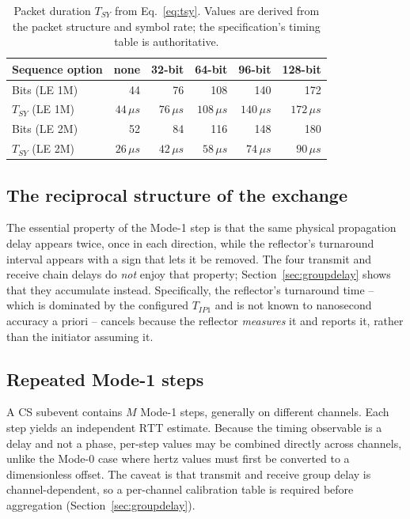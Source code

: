 \documentclass[11pt,a4paper]{article}
\newcommand{\us}{\,\ensuremath{\upmu}s}
\newcommand{\RTT}{\mathrm{RTT}}
\newcommand{\Tsy}{T_{SY}}
\newcommand{\Tip}{T_{IP1}}
\providecommand{\upmu}{\mu}
\begin{document}
\begin{table}[h]
\caption{Packet duration $\Tsy$ from Eq.~\eqref{eq:tsy}. Values are derived from the packet
structure and symbol rate; the specification's timing table is authoritative.}
\label{tab:tsy}
\centering\small
\begin{tabular}{@{}L{30mm}rrrrr@{}}
\toprule
Sequence option & none & 32-bit & 64-bit & 96-bit & 128-bit \\
\midrule
Bits (LE 1M) & 44 & 76 & 108 & 140 & 172 \\
$\Tsy$ (LE 1M) & $44\us$ & $76\us$ & $108\us$ & $140\us$ & $172\us$ \\[2pt]
Bits (LE 2M) & 52 & 84 & 116 & 148 & 180 \\
$\Tsy$ (LE 2M) & $26\us$ & $42\us$ & $58\us$ & $74\us$ & $90\us$ \\
\bottomrule
\end{tabular}
\end{table}

\subsection{The reciprocal structure of the exchange}

The essential property of the Mode-1 step is that the same physical propagation delay appears
twice, once in each direction, while the reflector's turnaround interval appears with a sign that
lets it be removed. The four transmit and receive chain delays do \emph{not} enjoy that property;
Section~\ref{sec:groupdelay} shows that they accumulate instead. Specifically, the reflector's
turnaround time -- which is dominated by the configured
$\Tip$ and is not known to nanosecond accuracy a priori -- cancels because the reflector
\emph{measures} it and reports it, rather than the initiator assuming it.

\subsection{Repeated Mode-1 steps}

A CS subevent contains $M$ Mode-1 steps, generally on different channels. Each step yields an
independent $\RTT$ estimate. Because the timing observable is a delay and not a phase, per-step
values may be combined directly across channels, unlike the Mode-0 case where hertz values must
first be converted to a dimensionless offset. The caveat is that transmit and receive group delay
is channel-dependent, so a per-channel calibration table is required before aggregation
(Section~\ref{sec:groupdelay}).
\end{document}
